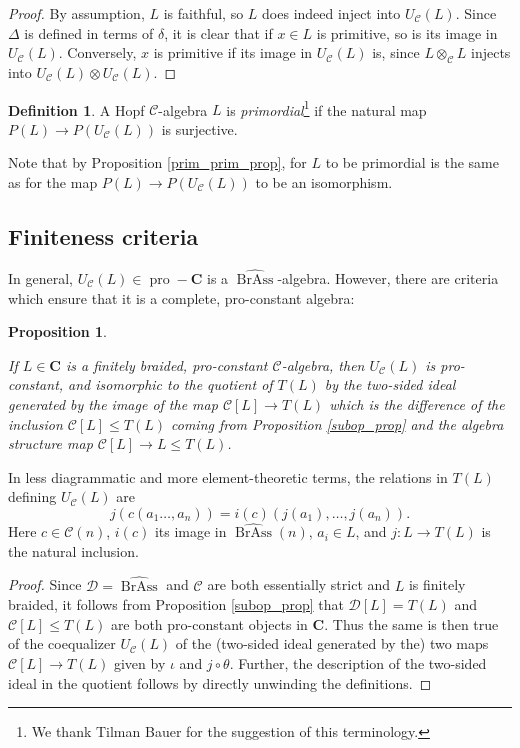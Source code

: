\documentclass[12pt]{article}
\DeclareMathOperator{\pro}{pro}
\DeclareMathOperator{\BrAss}{BrAss}
\newcommand{\BrAsshat}{\widehat{\BrAss}} %
\newcommand{\CC} {\mathcal{C}}
\newcommand{\DD} {\mathcal{D}}
\newcommand{\bC} {\mathbf{C}}
\newcommand{\proC}{\pro\!-\bC}
\newcommand{\beqn}{\begin{equation}}
\newcommand{\eeqn}{\end{equation}}
\theoremstyle{plain}
\newtheorem{prop}[thm]{Proposition}
\theoremstyle{definition}
\newtheorem{defn}[thm]{Definition}
\theoremstyle{remark}
\begin{document}
\begin{proof}

By assumption, $L$ is faithful, so $L$ does indeed inject into $U_{\CC}(L)$.  Since $\Delta$ is defined in terms of $\delta$, it is clear that if $x \in L$ is primitive, so is its image in $U_{\CC}(L)$.  Conversely, $x$ is primitive if its image in $U_{\CC}(L)$ is, since $L \otimes_{\CC} L$ injects into $U_{\CC}(L) \otimes U_{\CC}(L)$.

\end{proof}

\begin{defn}

A Hopf $\CC$-algebra $L$ is \emph{primordial}\footnote{We thank Tilman Bauer for the suggestion of this terminology.} if the natural map $P(L) \to P(U_{\CC}(L))$ is surjective.

\end{defn}

Note that by Proposition \ref{prim_prim_prop}, for $L$ to be primordial is the same as for the map $P(L) \to P(U_{\CC}(L))$ to be an isomorphism.  


\subsection{Finiteness criteria} 

In general, $U_{\CC}(L) \in \proC$ is a $\BrAsshat$-algebra.  However, there are criteria which ensure that it is a complete, pro-constant algebra:

\begin{prop} \label{enveloping_defn_prop}

If $L \in \bC$ is a finitely braided, pro-constant $\CC$-algebra, then $U_{\CC}(L)$ is pro-constant, and isomorphic to the quotient of $T(L)$ by the two-sided ideal generated by the image of the map $\CC[L] \to T(L)$ which is the difference of the inclusion $\CC[L] \leq T(L)$ coming from Proposition \ref{subop_prop} and the algebra structure map $\CC[L] \to L \leq T(L)$.

\end{prop}

In less diagrammatic and more element-theoretic terms, the relations in $T(L)$ defining $U_{\CC}(L)$ are 
%
\beqn \label{env_eqn} j(c(a_1 \dots, a_n)) = i(c)(j(a_1), \dots, j(a_n)).\eeqn
%
Here $c \in \CC(n)$, $i(c)$ its image in $\BrAsshat(n)$, $a_i \in L$, and $j: L \to T(L)$ is the natural inclusion.

\begin{proof}

Since $\DD = \BrAsshat$ and $\CC$ are both essentially strict and $L$ is finitely braided, it follows from Proposition \ref{subop_prop} that $\DD[L] = T(L)$ and $\CC[L] \leq T(L)$ are both pro-constant objects in $\bC$.  Thus the same is then true of the coequalizer $U_{\CC}(L)$ of the (two-sided ideal generated by the) two maps $\CC[L] \to T(L)$ given by $\iota$ and $j \circ \theta$.  Further, the description of the two-sided ideal in the quotient follows by directly unwinding the definitions.

\end{proof}
\end{document}

